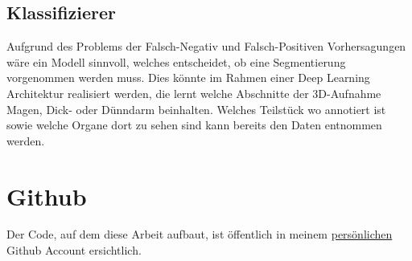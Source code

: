 \subsection{Klassifizierer}

Aufgrund des Problems der Falsch-Negativ und Falsch-Positiven Vorhersagungen wäre ein Modell sinnvoll, welches entscheidet, ob eine Segmentierung vorgenommen werden muss. Dies könnte im Rahmen einer Deep Learning Architektur realisiert werden, die lernt welche Abschnitte der 3D-Aufnahme Magen, Dick- oder Dünndarm beinhalten. Welches Teilstück wo annotiert ist sowie welche Organe dort zu sehen sind kann bereits den Daten entnommen werden.

\section{Github}

Der Code, auf dem diese Arbeit aufbaut, ist öffentlich in meinem \href{https://github.com/vitoleonardo/HealthyOrganTracker/}{persönlichen} Github Account ersichtlich. 

\pagebreak
